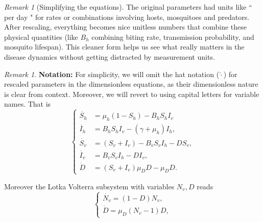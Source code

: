 \documentclass{amsart}
\theoremstyle{definition}
\theoremstyle{remark}
\newtheorem{rem}[thm]{Remark}
\numberwithin{equation}{section}
\begin{document}
	\begin{rem}[Simplifying the equations]
		The original parameters had units like `` per day " for rates or combinations involving hosts, mosquitoes and predators. After rescaling, everything becomes nice unitless numbers that combine these physical quantities (like $B_h$ combining biting rate, transmission probability, and mosquito lifespan). This cleaner form helps us see what really matters in the disease dynamics without getting distracted by measurement units.
	\end{rem}
	\begin{rem}
	\textbf{Notation:} For simplicity, we will omit the hat notation ($\hat{\cdot}$) for rescaled parameters in the dimensionless equations, as their dimensionless nature is clear from context. Moreover, we will revert to using capital letters for variable names. That is
	\begin{equation}
		\label{eq: modelo SILV}
		\begin{cases}
			\dot{S_h} & = \mu_h(1-S_h)-B_hS_hI_v\\
			\dot{I_h} & = B_h S_h I_v - (\gamma+\mu_h) I_h, \\
			\dot{S_v} & =  (S_v+I_v) - B_v S_v I_h  -  DS_v, \\
			\dot{I_v} & = B_v S_v I_h - DI_v, \\
			\dot{D} & =   (S_v + I_v )\mu_D D -\mu_D D .
		\end{cases}
	\end{equation}
\end{rem}
Moreover the Lotka Volterra subsystem with variables $N_v,D$ reads
	\begin{equation}\label{eq: LV simple}
\begin{cases}
	\dot{N_v} = (1 - D) N_v,\\[2mm]
	\dot{D} = \mu_D (N_v -1) D,
\end{cases}
\end{equation}
\end{document}
